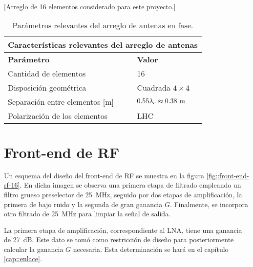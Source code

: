 \documentclass[../../main.tex]{subfiles}
\begin{document}
[Arreglo de 16 elementos considerado para este proyecto.]

\begin{table}[H]
\centering
\begin{tabular}{|ll|}
\hline
\multicolumn{2}{|c|}{\textbf{Características relevantes del arreglo de antenas}} \\ \hline
\multicolumn{1}{|l|}{\textbf{Parámetro}} & \textbf{Valor} \\ \hline
\multicolumn{1}{|l|}{Cantidad de elementos} & 16 \\ \hline
\multicolumn{1}{|l|}{Disposición geométrica} & Cuadrada $4 \times 4$ \\ \hline
\multicolumn{1}{|l|}{Separación entre elementos {[}m{]}} & $0.55\lambda_c \approx 0.38~\textrm{m}$ \\ \hline
\multicolumn{1}{|l|}{Polarización de los elementos} & LHC \\ \hline
\end{tabular}
\caption{Parámetros relevantes del arreglo de antenas en fase.}\label{tab::parametros-array}
\end{table}

\section{Front-end de RF}\label{sec::planteo-front-end}

Un esquema del diseño del front-end de RF se muestra en la figura \ref{fig::front-end-rf-16}. En dicha imagen se observa una primera etapa de filtrado empleando un filtro grueso preselector de 25~MHz, seguido por dos etapas de amplificación, la primera de bajo ruido y la segunda de gran ganancia $G$. Finalmente, se incorpora otro filtrado de 25~MHz para limpiar la señal de salida.


La primera etapa de amplificación, correspondiente al LNA, tiene una ganancia de 27~dB. Este dato se tomó como restricción de diseño para posteriormente calcular la ganancia $G$ necesaria. Esta determinación se hará en el capítulo \ref{cap::enlace}.
\end{document}
